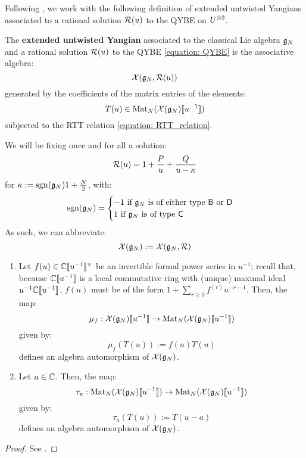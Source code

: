         Following \cite[Definition 2.1]{guay_regelskis_twisted_yangians_for_symmetric_pairs_of_types_BCD}, we work with the following definition of extended untwisted Yangians associated to a rational solution $\mathcal{R}(u)$ to the QYBE on $U^{\tensor 3}$.
        \begin{definition} \label{def: extended_untwisted_yangians}
            The \textbf{extended untwisted Yangian} associated to the classical Lie algebra $\mathfrak{g}_N$ and a rational solution $\mathcal{R}(u)$ to the QYBE \eqref{equation: QYBE} is the associative algebra:
                $$\mathcal{X}(\mathfrak{g}_N, \mathcal{R}(u))$$
            generated by the coefficients of the matrix entries of the elements:
                $$T(u) \in \mathrm{Mat}_N( \mathcal{X}(\mathfrak{g}_N)[\![u^{-1}]\!] )$$
            subjected to the RTT relation \eqref{equation: RTT_relation}.
        \end{definition}

        We will be fixing once and for all a solution:
            $$\mathcal{R}(u) = 1 + \frac{P}{u} + \frac{Q}{u - \kappa}$$
        for $\kappa := \operatorname{sgn}(\mathfrak{g}_N) 1 + \frac{N}{2}$, with:
            \begin{equation} \label{equation: BCD_signature}
                \operatorname{sgn}(\mathfrak{g}_N) =
                \begin{cases}
                    \text{$-1$ if $\mathfrak{g}_N$ is of either type $\mathsf{B}$ or $\mathsf{D}$}
                    \\
                    \text{$1$ if $\mathfrak{g}_N$ is of type $\mathsf{C}$}
                \end{cases}
            \end{equation}
        As such, we can abbreviate:
            $$\mathcal{X}(\mathfrak{g}_N) := \mathcal{X}(\mathfrak{g}_N, \mathcal{R})$$

        \begin{lemma} \label{lemma: automorphisms_of_extended_untwisted_yangians}
            \begin{enumerate}
                \item Let $f(u) \in \bbC[\![u^{-1}]\!]^{\x}$ be an invertible formal power series in $u^{-1}$; recall that, because $\mathbb{C}[\![u^{-1}]\!]$ is a local commutative ring with (unique) maximal ideal $u^{-1}\mathbb{C}[\![u^{-1}]\!]$, $f(u)$ must be of the form $1 + \sum_{r \geq 0} f^{(r)} u^{-r - 1}$. Then, the map:
                    $$\mu_f: \mathcal{X}(\mathfrak{g}_N)[\![u^{-1}]\!] \to \mathrm{Mat}_N(\mathcal{X}(\mathfrak{g}_N)[\![u^{-1}]\!])$$
                given by:
                    $$\mu_f( T(u) ) := f(u) T(u)$$
                defines an algebra automorphism of $\mathcal{X}(\mathfrak{g}_N)$.
                \item Let $a \in \mathbb{C}$. Then, the map:
                    $$\tau_a: \mathrm{Mat}_N(\mathcal{X}(\mathfrak{g}_N)[\![u^{-1}]\!]) \to \mathrm{Mat}_N(\mathcal{X}(\mathfrak{g}_N)[\![u^{-1}]\!])$$
                given by:
                    $$\tau_a( T(u) ) := T(u - a)$$
                defines an algebra automorphism of $\mathcal{X}(\mathfrak{g}_N)$.
            \end{enumerate}
        \end{lemma}
            \begin{proof}
                See \cite[Section 2]{guay_regelskis_twisted_yangians_for_symmetric_pairs_of_types_BCD}.
            \end{proof}

